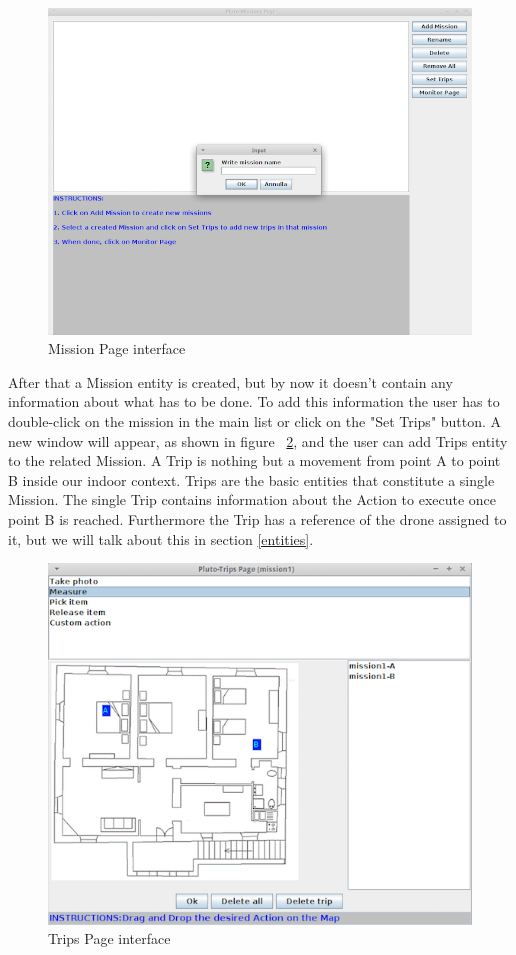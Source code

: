 \begin{figure}[H]
  \centering
  \includegraphics[width=\linewidth]{pictures/MissionPage.png}
  \caption{Mission Page interface}
  \label{fig:MissionPage}
\end{figure}


After that a Mission entity is created, but by now it doesn't contain any information about what has to be done. To add this information the user has to double-click on the mission in the main list or click on the "Set Trips" button. A new window will appear, as shown in figure  ~\ref{fig:TripsPage}, and the user can add Trips entity to the related Mission. A Trip is nothing but a movement from point A to point B inside our indoor context. Trips are the basic entities that constitute a single Mission. The single Trip contains information about the Action to execute once point B is reached. Furthermore the Trip has a reference of the drone assigned to it, but we will talk about this in section \ref{entities}.

\begin{figure}[H]
  \centering
  \includegraphics[width=\linewidth]{pictures/TripsPage.png}
  \caption{Trips Page interface}
  \label{fig:TripsPage}
\end{figure}

